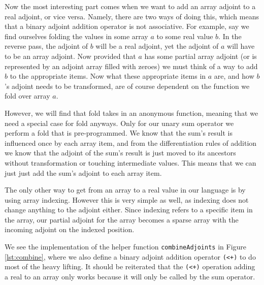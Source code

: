         Now the most interesting part comes when we want to add an array adjoint to a real adjoint, or vice versa.
        Namely, there are two ways of doing this, which means that a binary adjoint addition operator is not associative.
        For example, say we find ourselves folding the values in some array $a$ to some real value $b$.
        In the reverse pass, the adjoint of $b$ will be a real adjoint, yet the adjoint of $a$ will have to be an array adjoint.
        Now provided that $a$ has some partial array adjoint (or is represented by an adjoint array filled with zeroes) we must think of a way to add $b$ to the appropriate items.
        Now what these appropriate items in $a$ are, and how $b$'s adjoint needs to be transformed, are of course dependent on the function we fold over array $a$.

        However, we will find that fold takes in an anonymous function, meaning that we need a special case for fold anyways.
        Only for our unary sum operator we perform a fold that is pre-programmed.
        We know that the sum's result is influenced once by each array item, and from the differentiation rules of addition we know that the adjoint of the sum's result is just moved to its ancestors without transformation or touching intermediate values.
        This means that we can just just add the sum's adjoint to each array item.

        The only other way to get from an array to a real value in our language is by using array indexing.
        However this is very simple as well, as indexing does not change anything to the adjoint either.
        Since indexing refers to a specific item in the array, our partial adjoint for the array becomes a sparse array with the incoming adjoint on the indexed position.

        We see the implementation of the helper function \texttt{combineAdjoints} in Figure \ref{lst:combine}, where we also define a binary adjoint addition operator \lstinline{(<+)} to do most of the heavy lifting.
        It should be reiterated that the \lstinline{(<+)} operation adding a real to an array only works because it will only be called by the sum operator.

